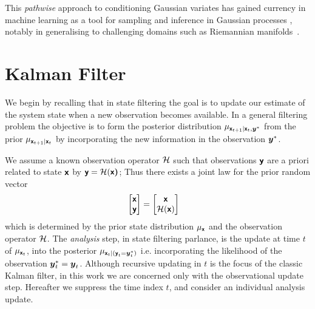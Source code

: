 \documentclass[wcp]{jmlr} %
\begin{document}
This \emph{pathwise} approach to conditioning Gaussian variates has gained currency in machine learning as a tool for sampling and inference in Gaussian processes \citep{Wilson2020Efficiently,Wilson2021Pathwise}, notably in generalising to challenging domains such as Riemannian manifolds~\citep{Borovitskiy2020Matern}.

\section{Kalman Filter}
We begin by recalling that in state filtering the goal is to update our estimate of the system state when a new observation becomes available. In a general filtering problem the objective is to form the posterior distribution \(\Law[\vrv{x}_{t+1} \gvn \vrv{x}_t, \vv{y}^*]\) from the prior \(\Law[\vrv{x}_{t+1} \gvn \vrv{x}_t]\) by incorporating the new information in the observation \(\boldsymbol{y}^*\).

We assume a known observation operator $\mathcal{H}$ such that observations $\boldsymbol{\mathsf{y}}$ are a priori related to state $\boldsymbol{\mathsf{x}}$ by $\boldsymbol{\mathsf{y}}=\mathcal{H}(\boldsymbol{\mathsf{x}}\boldsymbol{\mathsf{)}}$; Thus there exists a joint law for the prior random vector
\begin{align}
    \begin{bmatrix}
        \boldsymbol{\mathsf{x}}\\
        \boldsymbol{\mathsf{y}}
    \end{bmatrix} &= \begin{bmatrix}
        \boldsymbol{\mathsf{x}}\\
        \mathcal{H}(\boldsymbol{\mathsf{x}})
    \end{bmatrix}\label{eq:joint-law}
\end{align}
which is determined by the prior state distribution $\Law[\vrv{x}]$ and the observation operator $\mathcal{H}$.
The  \emph {analysis} step, in state filtering parlance, is the update at time $t$ of  \(\Law[\vrv{x}_{t}]\), into the posterior \( \Law[\vrv{x}_t \gvn (\vrv{y}_t{=}\vv{y}_t^*)]\)
i.e. incorporating the likelihood of the observation $\boldsymbol{y}_t^*=\boldsymbol{y}_t$.
Although  recursive updating in $t$ is the focus of the classic Kalman filter, in this work we are concerned only with the observational update step.
Hereafter we suppress the time index $t$, and consider an individual analysis update.
\end{document}
